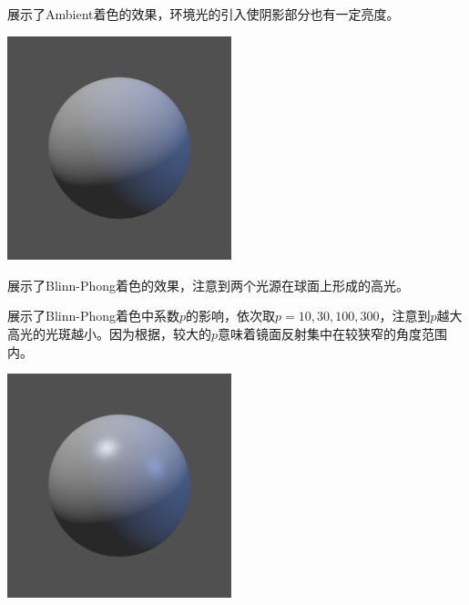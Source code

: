 展示了Ambient着色的效果，环境光的引入使阴影部分也有一定亮度。
\begin{Figure}[Ambient着色]
    \includegraphics[width=6.5cm]{image/RasterizationIOW/SphereAmbient.png}
\end{Figure}

展示了Blinn-Phong着色的效果，注意到两个光源在球面上形成的高光。

展示了Blinn-Phong着色中系数$p$的影响，依次取$p=10,30,100,300$，注意到$p$越大高光的光斑越小。因为根据，较大的$p$意味着镜面反射集中在较狭窄的角度范围内。

\begin{Figure}
    \includegraphics[width=6.5cm]{image/RasterizationIOW/SphereBlinnPhong.png}
\end{Figure}

